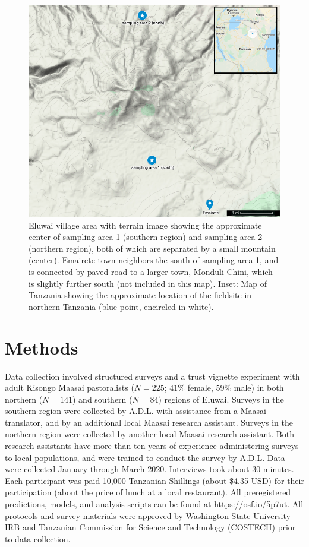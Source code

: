 \documentclass[
  11pt,
]{article}
\begin{document}
\begin{figure}[p]

{\centering \includegraphics[width=0.9\linewidth,height=0.9\textheight]{images/eluwai-terrain-map} 

}

\caption{Eluwai village area with terrain image showing the approximate center of sampling area 1 (southern region) and sampling area 2 (northern region), both of which are separated by a small mountain (center). Emairete town neighbors the south of sampling area 1, and is connected by paved road to a larger town, Monduli Chini, which is slightly further south (not included in this map). Inset: Map of Tanzania showing the approximate location of the fieldsite in northern Tanzania (blue point, encircled in white).}\label{fig:eluwaimap}
\end{figure}

\hypertarget{methods}{%
\section{Methods}\label{methods}}

Data collection involved structured surveys and a trust vignette
experiment with adult Kisongo Maasai pastoralists (\(N=225\); \(41\%\)
female, \(59\%\) male) in both northern (\(N=141\)) and southern
(\(N=84\)) regions of Eluwai. Surveys in the southern region were
collected by A.D.L. with assistance from a Maasai translator, and by an
additional local Maasai research assistant. Surveys in the northern
region were collected by another local Maasai research assistant. Both
research assistants have more than ten years of experience administering
surveys to local populations, and were trained to conduct the survey by
A.D.L. Data were collected January through March 2020. Interviews took
about 30 minutes. Each participant was paid 10,000 Tanzanian Shillings
(about \$4.35 USD) for their participation (about the price of lunch at
a local restaurant). All preregistered predictions, models, and analysis
scripts can be found at \url{https://osf.io/5p7ut}. All protocols and
survey materials were approved by Washington State University IRB and
Tanzanian Commission for Science and Technology (COSTECH) prior to data
collection.
\end{document}

